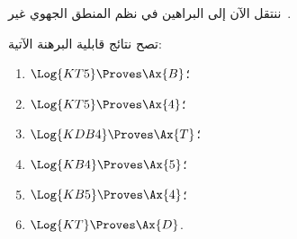 \documentclass[../../../include/open-logic-section]{subfiles}
\begin{document}


ننتقل الآن إلى البراهين في نظم المنطق الجهوي غير~.

\begin{prop}
تصح نتائج قابلية البرهنة الآتية:
  \begin{enumerate}
  \item $\Log{KT5} \Proves \Ax{B}$؛
  \item $\Log{KT5} \Proves \Ax{4}$؛
  \item $\Log{KDB4} \Proves \Ax{T}$؛
  \item $\Log{KB4} \Proves \Ax{5}$؛
  \item $\Log{KB5} \Proves \Ax{4}$؛
  \item {}$\Log{KT} \Proves \Ax{D}$.
  \end{enumerate}
\end{prop}
\end{document}
